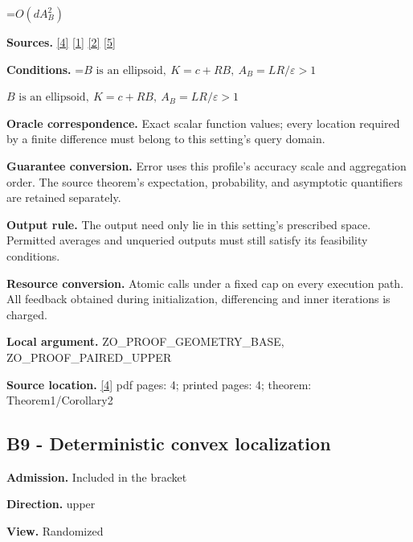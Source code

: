 \documentclass[10pt,a4paper]{article}
\newcommand{\AtlasMath}[1]{\par\begingroup\centering\setbox0=\hbox{$\displaystyle #1$}\ifdim\wd0>1.4\linewidth\typeout{ATLAS WIDE FORMULA: \the\wd0}\fi\ifdim\wd0>\linewidth\resizebox{\linewidth}{!}{\box0}\else\box0\fi\par\endgroup}
\newcommand{\AtlasInlineMath}[1]{\begingroup\setbox0=\hbox{$#1$}\ifdim\wd0>.4\linewidth\endgroup\AtlasMath{#1}\else\endgroup$#1$\fi}
\begin{document}
\AtlasMath{O(dA_B^2)}


\textbf{Sources.} \href{https://jmlr.org/papers/volume18/16-632/16-632.pdf}{[4]} \href{https://arxiv.org/html/2610.00345v1}{[1]} \href{https://arxiv.org/html/2607.16558v2}{[2]} \href{https://www.mathnet.ru/php/archive.phtml?jrnid=mzm&option_lang=eng&paperid=1697&wshow=paper}{[5]}



\textbf{Conditions.} \AtlasInlineMath{B\text{ is an ellipsoid},\ K=c+RB,\ A_B=LR/\varepsilon>1}



\textbf{Oracle correspondence.} Exact scalar function values; every location required by a finite difference must belong to this setting's query domain.



\textbf{Guarantee conversion.} Error uses this profile's accuracy scale and aggregation order. The source theorem's expectation, probability, and asymptotic quantifiers are retained separately.



\textbf{Output rule.} The output need only lie in this setting's prescribed space. Permitted averages and unqueried outputs must still satisfy its feasibility conditions.



\textbf{Resource conversion.} Atomic calls under a fixed cap on every execution path. All feedback obtained during initialization, differencing and inner iterations is charged.



\textbf{Local argument.} ZO\_PROOF\_GEOMETRY\_BASE, ZO\_PROOF\_PAIRED\_UPPER



\textbf{Source location.} \href{https://jmlr.org/papers/volume18/16-632/16-632.pdf}{[4]} pdf pages: 4; printed pages: 4; theorem: Theorem1/Corollary2



\subsection{B9 - Deterministic convex localization}


\textbf{Admission.} Included in the bracket



\textbf{Direction.} upper



\textbf{View.} Randomized
\end{document}
